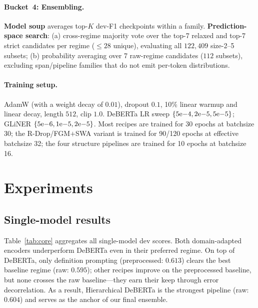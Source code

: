 \documentclass[11pt]{article}
\begin{document}
\paragraph{Bucket~4: Ensembling.} \textbf{Model soup} averages top-$K$
dev-F1 checkpoints within a family. \textbf{Prediction-space search}:
(a) cross-regime majority vote over the top-7 relaxed and top-7 strict
candidates per regime ($\leq 28$ unique), evaluating all $122{,}409$
size-2--5 subsets; (b) probability averaging over 7 raw-regime
candidates ($112$ subsets), excluding span/pipeline families that do
not emit per-token distributions.

\paragraph{Training setup.} AdamW (with a weight decay of $0.01$), dropout $0.1$, 10\%
linear warmup and linear decay, length $512$, clip $1.0$. DeBERTa LR
sweep $\{5{\rm e}{-4},2{\rm e}{-5},5{\rm e}{-5}\}$; GLiNER
$\{5{\rm e}{-6},1{\rm e}{-5},2{\rm e}{-5}\}$. Most recipes are trained for
30 epochs at batchsize 30; the R-Drop/FGM$+$SWA variant is trained for 90/120 epochs at effective batchsize 32; the four structure pipelines are trained for 10 epochs at batchsize 16.

\section{Experiments}
\label{sec:exp}

\subsection{Single-model results}

Table~\ref{tab:core} aggregates all single-model dev scores. Both domain-adapted encoders underperform DeBERTa even in their preferred regime. On top of DeBERTa, only definition prompting (preprocessed: $0.613$) clears the best baseline regime (raw: $0.595$); other recipes improve on the preprocessed baseline, but none crosses the raw baseline---they earn their keep through error decorrelation.
As a result, Hierarchical DeBERTa is the strongest pipeline (raw: $0.604$) and serves as the anchor of our final ensemble.
\end{document}

